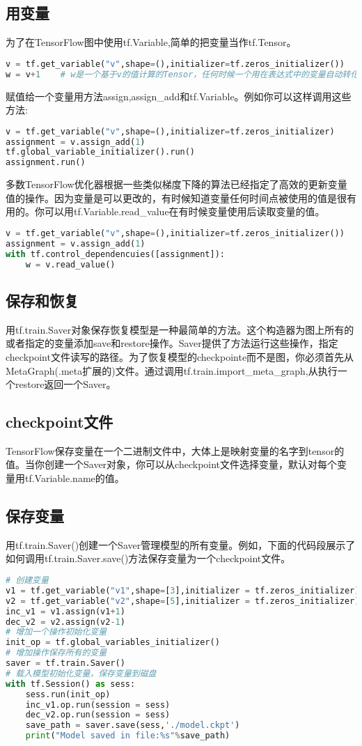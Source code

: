 \subsection{用变量}
为了在TensorFlow图中使用tf.Variable,简单的把变量当作tf.Tensor。
\begin{lstlisting}[language=Python]
v = tf.get_variable("v",shape=(),initializer=tf.zeros_initializer())
w = v+1    # w是一个基于v的值计算的Tensor，任何时候一个用在表达式中的变量自动转化一个tf.Tensor到它的值。
\end{lstlisting}
赋值给一个变量用方法assign,assign\_add和tf.Variable。例如你可以这样调用这些方法:
\begin{lstlisting}[language=Python]
v = tf.get_variable("v",shape=(),initializer=tf.zeros_initializer)
assignment = v.assign_add(1)
tf.global_variable_initializer().run()
assignment.run()
\end{lstlisting}
多数TensorFlow优化器根据一些类似梯度下降的算法已经指定了高效的更新变量值的操作。因为变量是可以更改的，有时候知道变量任何时间点被使用的值是很有用的。你可以用tf.Variable.read\_value在有时候变量使用后读取变量的值。
\begin{lstlisting}[language=Python]
v = tf.get_variable("v",shape=(),initializer=tf.zeros_initializer())
assignment = v.assign_add(1)
with tf.control_dependencuies([assignment]):
    w = v.read_value()
\end{lstlisting}
\subsection{保存和恢复}
用tf.train.Saver对象保存恢复模型是一种最简单的方法。这个构造器为图上所有的或者指定的变量添加save和restore操作。Saver提供了方法运行这些操作，指定checkpoint文件读写的路径。为了恢复模型的checkpointe而不是图，你必须首先从MetaGraph(.meta扩展的)文件。通过调用tf.train.import\_meta\_graph,从执行一个restore返回一个Saver。
\subsection{checkpoint文件}
TensorFlow保存变量在一个二进制文件中，大体上是映射变量的名字到tensor的值。当你创建一个Saver对象，你可以从checkpoint文件选择变量，默认对每个变量用tf.Variable.name的值。
\subsection{保存变量}
用tf.train.Saver()创建一个Saver管理模型的所有变量。例如，下面的代码段展示了如何调用tf.train.Saver.save()方法保存变量为一个checkpoint文件。
\begin{lstlisting}[language=Python]
# 创建变量
v1 = tf.get_variable("v1",shape=[3],initializer = tf.zeros_initializer)
v2 = tf.get_variable("v2",shape=[5],initializer = tf.zeros_initializer)
inc_v1 = v1.assign(v1+1)
dec_v2 = v2.assign(v2-1)
# 增加一个操作初始化变量
init_op = tf.global_variables_initializer()
# 增加操作保存所有的变量
saver = tf.train.Saver()
# 载入模型初始化变量，保存变量到磁盘
with tf.Session() as sess:
    sess.run(init_op)
    inc_v1.op.run(session = sess)
    dec_v2.op.run(session = sess)
    save_path = saver.save(sess,'./model.ckpt')
    print("Model saved in file:%s"%save_path)
\end{lstlisting}
